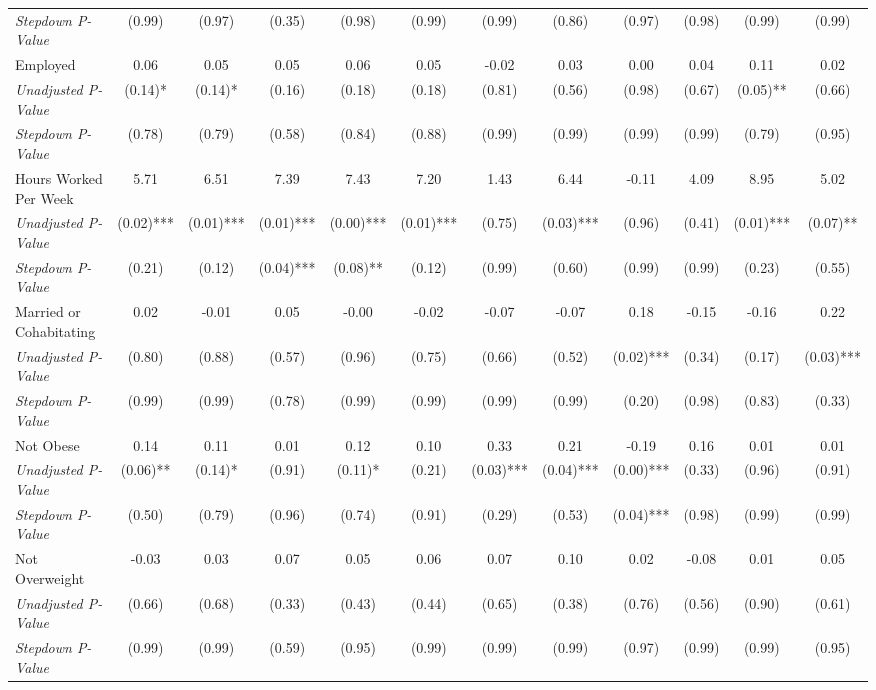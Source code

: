 \begin{tabular}{l c c c c c c c c c c c}
\quad \textit{Stepdown P-Value} & (0.99) & (0.97) & (0.35) & (0.98) & (0.99) & (0.99) & (0.86) & (0.97) & (0.98) & (0.99) & (0.99) \\
Employed & 0.06 & 0.05 & 0.05 & 0.06 & 0.05 & -0.02 & 0.03 & 0.00 & 0.04 & 0.11 & 0.02 \\
\quad \textit{Unadjusted P-Value} & (0.14)* & (0.14)* & (0.16) & (0.18) & (0.18) & (0.81) & (0.56) & (0.98) & (0.67) & (0.05)** & (0.66) \\
\quad \textit{Stepdown P-Value} & (0.78) & (0.79) & (0.58) & (0.84) & (0.88) & (0.99) & (0.99) & (0.99) & (0.99) & (0.79) & (0.95) \\
Hours Worked Per Week & 5.71 & 6.51 & 7.39 & 7.43 & 7.20 & 1.43 & 6.44 & -0.11 & 4.09 & 8.95 & 5.02 \\
\quad \textit{Unadjusted P-Value} & (0.02)*** & (0.01)*** & (0.01)*** & (0.00)*** & (0.01)*** & (0.75) & (0.03)*** & (0.96) & (0.41) & (0.01)*** & (0.07)** \\
\quad \textit{Stepdown P-Value} & (0.21) & (0.12) & (0.04)*** & (0.08)** & (0.12) & (0.99) & (0.60) & (0.99) & (0.99) & (0.23) & (0.55) \\
Married or Cohabitating & 0.02 & -0.01 & 0.05 & -0.00 & -0.02 & -0.07 & -0.07 & 0.18 & -0.15 & -0.16 & 0.22 \\
\quad \textit{Unadjusted P-Value} & (0.80) & (0.88) & (0.57) & (0.96) & (0.75) & (0.66) & (0.52) & (0.02)*** & (0.34) & (0.17) & (0.03)*** \\
\quad \textit{Stepdown P-Value} & (0.99) & (0.99) & (0.78) & (0.99) & (0.99) & (0.99) & (0.99) & (0.20) & (0.98) & (0.83) & (0.33) \\
Not Obese & 0.14 & 0.11 & 0.01 & 0.12 & 0.10 & 0.33 & 0.21 & -0.19 & 0.16 & 0.01 & 0.01 \\
\quad \textit{Unadjusted P-Value} & (0.06)** & (0.14)* & (0.91) & (0.11)* & (0.21) & (0.03)*** & (0.04)*** & (0.00)*** & (0.33) & (0.96) & (0.91) \\
\quad \textit{Stepdown P-Value} & (0.50) & (0.79) & (0.96) & (0.74) & (0.91) & (0.29) & (0.53) & (0.04)*** & (0.98) & (0.99) & (0.99) \\
Not Overweight & -0.03 & 0.03 & 0.07 & 0.05 & 0.06 & 0.07 & 0.10 & 0.02 & -0.08 & 0.01 & 0.05 \\
\quad \textit{Unadjusted P-Value} & (0.66) & (0.68) & (0.33) & (0.43) & (0.44) & (0.65) & (0.38) & (0.76) & (0.56) & (0.90) & (0.61) \\
\quad \textit{Stepdown P-Value} & (0.99) & (0.99) & (0.59) & (0.95) & (0.99) & (0.99) & (0.99) & (0.97) & (0.99) & (0.99) & (0.95) \\

\end{tabular}
